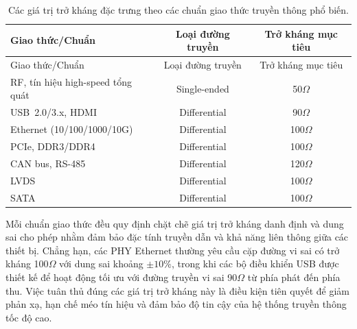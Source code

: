                         \begin{longtable}{|l|c|c|}
                            \caption{Các giá trị trở kháng đặc trưng theo các chuẩn giao thức truyền thông phổ biến.}
                            \label{tab:impedance_standards} \\
                            \hline
                            Giao thức/Chuẩn & Loại đường truyền & Trở kháng mục tiêu \\
                            \hline
                            \endfirsthead
                        
                            \hline
                            Giao thức/Chuẩn & Loại đường truyền & Trở kháng mục tiêu \\
                            \hline
                            \endhead
                        
                            \hline
                            \endfoot
                        
                            \hline
                            \endlastfoot
                        
                            RF, tín hiệu high-speed tổng quát & Single-ended & 50\(\Omega\) \\
                            USB~2.0/3.x, HDMI & Differential & 90\(\Omega\) \\
                            Ethernet (10/100/1000/10G) & Differential & 100\(\Omega\) \\
                            PCIe, DDR3/DDR4 & Differential & 100\(\Omega\) \\
                            CAN bus, RS-485 & Differential & 120\(\Omega\) \\
                            LVDS & Differential & 100\(\Omega\) \\
                            SATA & Differential & 100\(\Omega\) \\
                        \end{longtable}
                        
                        Mỗi chuẩn giao thức đều quy định chặt chẽ giá trị trở kháng danh định và dung sai cho phép nhằm đảm bảo đặc tính truyền dẫn và khả năng liên thông giữa các thiết bị. Chẳng hạn, các PHY Ethernet thường yêu cầu cặp đường vi sai có trở kháng 100\(\Omega\) với dung sai khoảng \(\pm 10\%\), trong khi các bộ điều khiển USB được thiết kế để hoạt động tối ưu với đường truyền vi sai 90\(\Omega\) từ phía phát đến phía thu. Việc tuân thủ đúng các giá trị trở kháng này là điều kiện tiên quyết để giảm phản xạ, hạn chế méo tín hiệu và đảm bảo độ tin cậy của hệ thống truyền thông tốc độ cao.
                    
